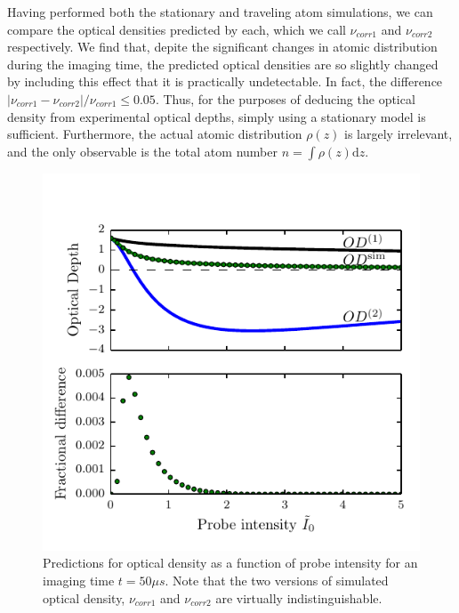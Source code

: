 \documentclass[12pt]{iopart}
\begin{document}
\par Having performed both the stationary and traveling atom simulations, we can compare the optical densities predicted by each, which we call $\nu_{corr1}$ and $\nu_{corr2}$ respectively. We find that, depite the significant changes in atomic distribution during the imaging time, the predicted optical densities are so slightly changed by including this effect that it is practically undetectable. In fact, the difference $\left|\nu_{corr1}-\nu_{corr2}\right|/\nu_{corr1} \le 0.05$. Thus, for the purposes of deducing the optical density from experimental optical depths, simply using a stationary model is sufficient. Furthermore, the actual atomic distribution $\rho(z)$ is largely irrelevant, and the only observable is the total atom number $n=\int\rho(z)\mathrm{d}z$. 
\begin{figure}
	\includegraphics[scale=0.57]{figure7}
\caption{Predictions for optical density as a function of probe intensity for an imaging time $t=50\mu s$. Note that the two versions of simulated optical density, $\nu_{corr1}$ and $\nu_{corr2}$ are virtually indistinguishable. }  
\label{fig:atomTravel}
\end{figure}
\end{document}
